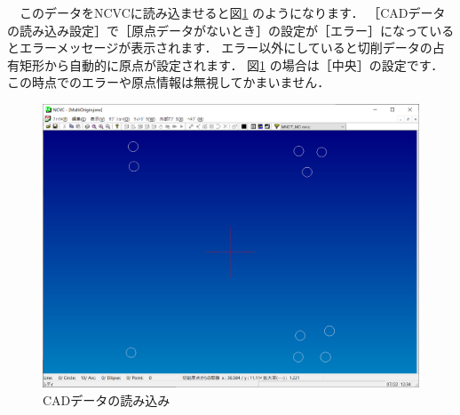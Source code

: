 　このデータをNCVCに読み込ませると図\ref{fig:read} のようになります．
［CADデータの読み込み設定］で［原点データがないとき］の設定が［エラー］になっているとエラーメッセージが表示されます．
エラー以外にしていると切削データの占有矩形から自動的に原点が設定されます．
図\ref{fig:read} の場合は［中央］の設定です．
この時点でのエラーや原点情報は無視してかまいません．

\begin{figure}[H]
\centering
\includegraphics[scale=0.5]{No2/fig/read.png}
\caption{CADデータの読み込み}
\label{fig:read}
\end{figure}
